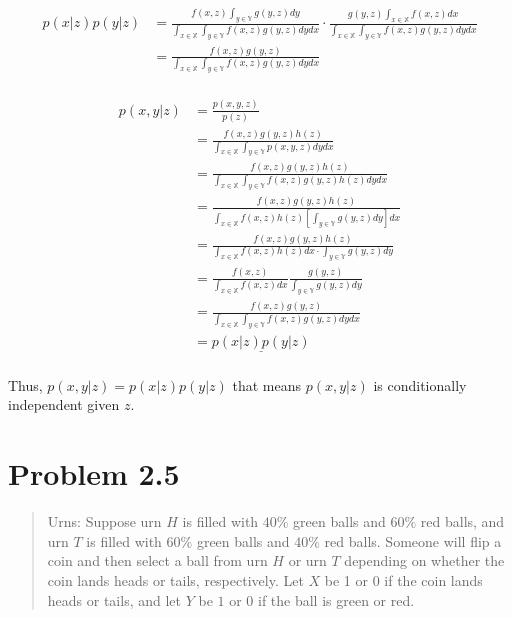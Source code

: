 \documentclass[
  letterpaper,
  DIV=11,
  numbers=noendperiod]{scrreprt}
\begin{document}
\[
\begin{aligned}
p(x|z)p(y|z) &= \frac{f(x,z)\int_{y\in\mathbb{Y}}g(y,z)dy}{\int_{x\in\mathbb{X}}\int_{y\in\mathbb{Y}} f(x,z)g(y,z) dydx} \cdot \frac{g(y,z)\int_{x\in \mathbb{X}} f(x,z)dx}{\int_{x\in\mathbb{X}}\int_{y\in\mathbb{Y}} f(x,z)g(y,z) dydx}\\
            &= \frac{f(x,z)g(y,z)}{\int_{x\in\mathbb{X}}\int_{y\in\mathbb{Y}} f(x,z)g(y,z) dydx}\\
\end{aligned}
\]

\[
\begin{aligned}
    p(x,y|z) &= \frac{p(x,y,z)}{p(z)}\\
             &= \frac{f(x,z)g(y,z)h(z)}{\int_{x\in\mathbb{X}}\int_{y\in\mathbb{Y}} p(x,y,z) dy dx}\\ 
             &= \frac{f(x,z)g(y,z)h(z)}{\int_{x\in\mathbb{X}}\int_{y\in\mathbb{Y}} f(x,z)g(y,z)h(z) dy dx}\\
             &= \frac{f(x,z)g(y,z)h(z)}{\int_{x\in\mathbb{X}}f(x,z)h(z)\left[\int_{y\in\mathbb{Y}} g(y,z) dy\right] dx}\\ 
             &= \frac{f(x,z)g(y,z)h(z)}{\int_{x\in\mathbb{X}}f(x,z)h(z)dx \cdot \int_{y\in\mathbb{Y}} g(y,z) dy}\\ 
             &=  \frac{f(x,z)}{\int_{x\in\mathbb{X}}f(x,z)dx}\frac{g(y,z)}{\int_{y\in\mathbb{Y}} g(y,z) dy}\\
             &= \frac{f(x,z)g(y,z)}{\int_{x\in\mathbb{X}}\int_{y\in\mathbb{Y}} f(x,z)g(y,z) dydx}\\
             &= \underline{p(x|z)p(y|z)}\\
\end{aligned}
\]

Thus, \(p(x,y|z) = p(x|z)p(y|z)\) that means \(p(x,y|z)\) is
conditionally independent given \(z\).

\hypertarget{problem-2.5}{%
\section{Problem 2.5}\label{problem-2.5}}

\begin{quote}
Urns: Suppose urn \(H\) is filled with \(40\%\) green balls and \(60\%\)
red balls, and urn \(T\) is filled with \(60\%\) green balls and
\(40\%\) red balls. Someone will flip a coin and then select a ball from
urn \(H\) or urn \(T\) depending on whether the coin lands heads or
tails, respectively. Let \(X\) be 1 or 0 if the coin lands heads or
tails, and let \(Y\) be \(1\) or \(0\) if the ball is green or red.
\end{quote}
\end{document}
